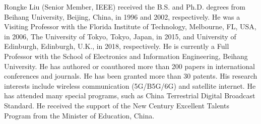 \documentclass[lettersize,journal]{IEEEtran}
\begin{document}
\begin{IEEEbiography}{Rongke Liu} (Senior Member, IEEE) received the B.S. and Ph.D. degrees from Beihang University, Beijing, China, in 1996 and 2002, respectively. He was a Visiting Professor with the Florida Institute of Technology, Melbourne, FL, USA, in 2006, The University of Tokyo, Tokyo, Japan, in 2015, and University of Edinburgh, Edinburgh, U.K., in 2018, respectively. He is currently a Full Professor with the School of Electronics and Information Engineering, Beihang University. He has authored or coauthored more than 200 papers in international conferences and journals. He has been granted more than 30 patents. His research interests include wireless communication (5G/B5G/6G) and satellite internet. He has attended many special programs, such as China Terrestrial Digital Broadcast Standard. He received the support of the New Century Excellent Talents Program from the Minister of Education, China.
\end{IEEEbiography}






\vfill
\end{document}
